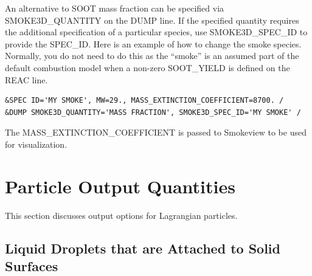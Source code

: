 \documentclass[11pt]{book}
\begin{document}
An alternative to {\ct SOOT} mass fraction can be specified via {\ct SMOKE3D\_QUANTITY} on the {\ct DUMP} line. If the specified quantity requires the additional specification of a particular species, use {\ct SMOKE3D\_SPEC\_ID} to provide the {\ct SPEC\_ID}. Here is an example of how to change the smoke species. Normally, you do not need to do this as the ``smoke'' is an assumed part of the default combustion model when a non-zero {\ct SOOT\_YIELD} is defined on the {\ct REAC} line.
\begin{lstlisting}
&SPEC ID='MY SMOKE', MW=29., MASS_EXTINCTION_COEFFICIENT=8700. /
&DUMP SMOKE3D_QUANTITY='MASS FRACTION', SMOKE3D_SPEC_ID='MY SMOKE' /
\end{lstlisting}
The {\ct MASS\_EXTINCTION\_COEFFICIENT} is passed to Smokeview to be used for visualization.



\section{Particle Output Quantities}
\label{info:part_output}

This section discusses output options for Lagrangian particles.

\subsection{Liquid Droplets that are Attached to Solid Surfaces}
\end{document}
